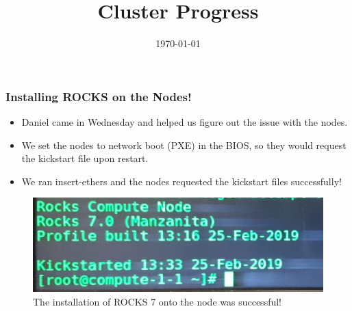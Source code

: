 \documentclass{beamer}
\title{Cluster Progress}
\date{\today}
\begin{document}

\begin{frame}
  \maketitle
\end{frame}



\begin{frame}

  \frametitle{Installing ROCKS on the Nodes!}

  \begin{itemize}
  \item Daniel came in Wednesday and helped us figure out the issue with the nodes. 
  \item We set the nodes to network boot (PXE) in the BIOS, so they would request the kickstart file upon restart. 
    \item We ran insert-ethers and the nodes requested the kickstart files successfully! 
  \end{itemize}

  \begin{figure}[H]
    \begin{center}
      \includegraphics[scale=0.2]{compute-1-1.png}
    \end{center}
    \caption{The installation of ROCKS 7 onto the node was successful!}
  \end{figure}

\end{frame}
\end{document}
